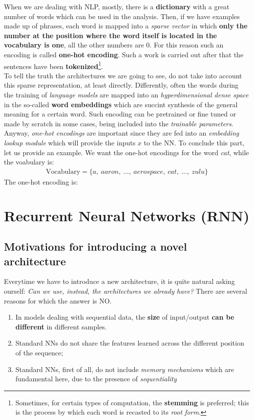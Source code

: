 When we are dealing with NLP, mostly, there is a \textbf{dictionary} with a great number of words which can be used in the analysis. Then, if we have examples made up of phrases, each word is mapped into a \textit{sparse vector} in which \textbf{only the number at the position where the word itself is located in the vocabulary is one}, all the other numbers are 0. For this reason such an encoding is called \textbf{one-hot encoding}. 
Such a work is carried out after that the sentences have been \textbf{tokenized}\footnote{
    Sometimes, for certain types of computation, the \textbf{stemming} is preferred; this is the process by which each word is recasted to its \textit{root form}.
}. \\
To tell the truth the architectures we are going to see, do not take into account this sparse representation, at least directly. Differently, often the words during the training of \textit{language models} are mapped into an \textit{hyperdimensional dense space} in the so-called \textbf{word embeddings} which are succint synthesis of the general meaning for a certain word. Such encoding can be pretrained or fine tuned or made by scratch in some cases, being included into the \textit{trainable parameters}. Anyway, \textit{one-hot encodings} are important since they are fed into an \textit{embedding lookup module} which will provide the inputs $x$ to the NN. To conclude this part, let us provide an example. We want the one-hot encodings for the word \textit{cat}, while the voabulary is: 
\begin{align*}
    \text{Vocabulary} =\{ a,\ aaron, \ ..., \  aerospace, \ cat, \ ..., \  zulu\}
\end{align*}
The one-hot encoding is:
\begin{equation*}
    [0, \ 0, \ ... \ 0, \ 1, \ ..., 0]
\end{equation*}

\section{Recurrent Neural Networks (RNN)}
\subsection{Motivations for introducing a novel architecture}
Everytime we have to introduce a new architecture, it is quite natural asking ourself: \textit{Can we use, instead, the architectures we already have?} There are several reasons for which the answer is NO.
\begin{enumerate}
    \itemsep-0.2em
    \item In models dealing with sequential data, the \textbf{size} of input/output \textbf{can be different} in different samples.
    \item Standard NNs do not share the features learned across the different position of the sequence; 
    \item Standard NNs, first of all, do not include \textit{ memory mechanisms} which are fundamental here, due to the presence of \textit{sequentiality}
\end{enumerate}

